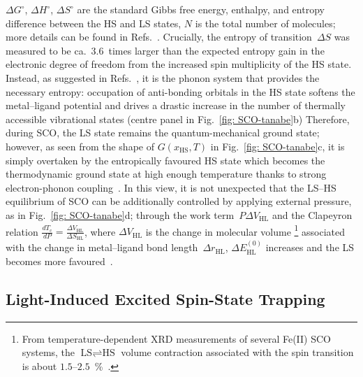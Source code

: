 $\Delta G^\circ$, $\Delta H^\circ$, $\Delta S^\circ$ are the standard Gibbs free energy,
enthalpy, and entropy difference between the HS and LS states,
$N$ is the total number of molecules;
more details can be found in Refs.~\cite{Slichter1972, Gutlich1979}.
%
Crucially, the entropy of transition~$\Delta S$ was measured to be ca.~3.6~times
larger than the expected entropy gain in the electronic degree of freedom
from the increased spin multiplicity of the HS state.
%
Instead, as suggested in Refs.~\cite{Ewald1964, Ewald1969},
it is the phonon system that provides the necessary entropy:
occupation of anti-bonding orbitals in the HS state softens
the metal--ligand potential and drives a drastic increase
in the number of thermally accessible vibrational states
(centre panel in Fig.~\ref{fig: SCO-tanabe}b)
%
Therefore, during SCO, the LS state remains the quantum-mechanical ground state;
however, as seen from the shape of $G(x_\text{HS}, T)$ in Fig.~\ref{fig: SCO-tanabe}c,
it is simply overtaken by the entropically favoured HS state
which becomes the thermodynamic ground state at high enough temperature
thanks to strong electron-phonon coupling~\cite{SCO-III}.
%
In this view, it is not unexpected that the LS--HS equilibrium of SCO
can be additionally controlled by applying external pressure, as in Fig.~\ref{fig: SCO-tanabe}d;
through the work term~$P \Delta V_\text{HL}$ and the Clapeyron relation
$\frac{d T_\text{c}}{d P} = \frac{\Delta V_\text{HL}}{\Delta S_\text{HL}}$,
where $\Delta V_\text{HL}$ is the change in molecular volume%
\footnote{From temperature-dependent XRD measurements of several Fe(II) SCO systems,
the $\text{LS} \rightleftharpoons \text{HS}$ volume contraction associated with the spin transition
is about $1.5$--$2.5$~\%~\cite{Guionneau1999, SCO-II}.\label{fn: volume-contraction}}
associated with the change in metal--ligand bond length~$\Delta r_\text{HL}$,
$\Delta E_\text{HL}^{(0)}$ increases and
the LS becomes more favoured~\cite{Ewald1969, Ksenofontov1998, Boillot2002}.

\subsection{Light-Induced Excited Spin-State Trapping}
\label{sec: SCO-photo-1}

